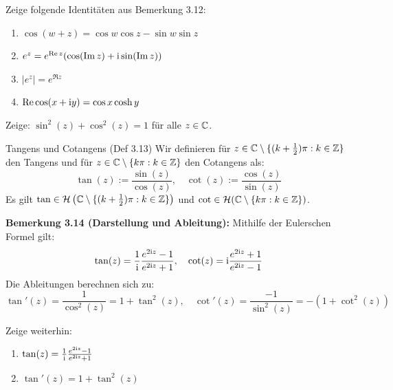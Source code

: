 \vspace{0.3cm}
\begin{tcolorbox}[colback=yellow!5!white, colframe=orange!75!black, fonttitle=\bfseries, title={Übungsblatt 2, Aufgabe 1}]
Zeige folgende Identitäten aus Bemerkung 3.12:
\begin{enumerate}
    \item[a)] $\cos(w+z) = \cos w \cos z - \sin w \sin z$
    \item[b)] $e^z = e^{\operatorname{Re} z}(\cos(\operatorname{Im} z) + \mathrm{i} \sin(\operatorname{Im} z))$
    \item[c)] $|e^z| = e^{\Re z}$
    \item[d)] $\operatorname{Re} \cos(x+\mathrm{i} y) = \cos x \cosh y$
\end{enumerate}
\end{tcolorbox}
\vspace{0.3cm}

\begin{tcolorbox}[colback=yellow!5!white, colframe=orange!75!black, fonttitle=\bfseries, title={Übungsblatt 1, Aufgabe 4}]
Zeige: $\sin^2(z) + \cos^2(z) = 1$ für alle $z \in \mathbb{C}$.
\end{tcolorbox}
\vspace{0.3cm}

\begin{defi}{Tangens und Cotangens (Def 3.13)}
Wir definieren für $z \in \mathbb{C} \setminus \{(k+\frac{1}{2})\pi : k \in \mathbb{Z}\}$ den Tangens und für $z \in \mathbb{C} \setminus \{k\pi : k \in \mathbb{Z}\}$ den Cotangens als:
\[ \tan(z) := \frac{\sin(z)}{\cos(z)}, \quad \cot(z) := \frac{\cos(z)}{\sin(z)} \]
Es gilt $\tan \in \mathcal{H}\left(\mathbb{C} \setminus \{(k+\frac{1}{2})\pi : k \in \mathbb{Z}\}\right)$ und $\cot \in \mathcal{H}(\mathbb{C} \setminus \{k\pi : k \in \mathbb{Z}\})$.
\end{defi}

\textbf{Bemerkung 3.14 (Darstellung und Ableitung):}
Mithilfe der Eulerschen Formel gilt:
\[ \tan(z) = \frac{1}{\mathrm{i}} \frac{e^{2\mathrm{i} z}-1}{e^{2\mathrm{i} z}+1}, \quad \cot(z) = \mathrm{i} \frac{e^{2\mathrm{i} z}+1}{e^{2\mathrm{i} z}-1} \]
Die Ableitungen berechnen sich zu:
\[ \tan'(z) = \frac{1}{\cos^2(z)} = 1 + \tan^2(z), \quad \cot'(z) = \frac{-1}{\sin^2(z)} = -(1 + \cot^2(z)) \]

\vspace{0.3cm}
\begin{tcolorbox}[colback=yellow!5!white, colframe=orange!75!black, fonttitle=\bfseries, title={Übungsblatt 2, Aufgabe 1 (Fortsetzung)}]
Zeige weiterhin:
\begin{enumerate}
    \item[e)] $\tan(z) = \frac{1}{\mathrm{i}} \frac{e^{2\mathrm{i} z}-1}{e^{2\mathrm{i} z}+1}$
    \item[f)] $\tan'(z) = 1 + \tan^2(z)$
\end{enumerate}
\end{tcolorbox}